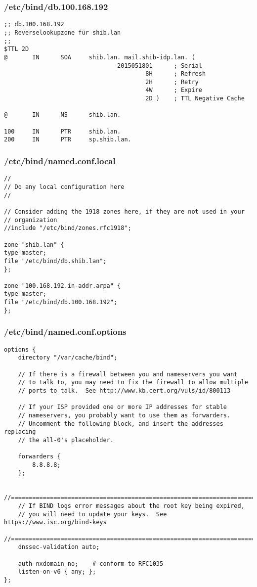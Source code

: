 \subsubsection{/etc/bind/db.100.168.192}
\begin{lstlisting}
;; db.100.168.192
;; Reverselookupzone für shib.lan
;;
$TTL 2D
@       IN      SOA     shib.lan. mail.shib-idp.lan. (
                                2015051801      ; Serial
                                        8H      ; Refresh
                                        2H      ; Retry
                                        4W      ; Expire
                                        2D )    ; TTL Negative Cache

@       IN      NS      shib.lan.

100     IN      PTR     shib.lan.
200     IN      PTR     sp.shib.lan.

\end{lstlisting}

\subsubsection{/etc/bind/named.conf.local}
\begin{lstlisting}
//
// Do any local configuration here
//

// Consider adding the 1918 zones here, if they are not used in your
// organization
//include "/etc/bind/zones.rfc1918";

zone "shib.lan" {
type master;
file "/etc/bind/db.shib.lan";
};

zone "100.168.192.in-addr.arpa" {
type master;
file "/etc/bind/db.100.168.192";
};
\end{lstlisting}

\subsubsection{/etc/bind/named.conf.options}
\begin{lstlisting}
options {
	directory "/var/cache/bind";

	// If there is a firewall between you and nameservers you want
	// to talk to, you may need to fix the firewall to allow multiple
	// ports to talk.  See http://www.kb.cert.org/vuls/id/800113

	// If your ISP provided one or more IP addresses for stable
	// nameservers, you probably want to use them as forwarders.
	// Uncomment the following block, and insert the addresses replacing
	// the all-0's placeholder.

	forwarders {
	 	8.8.8.8;
	};

	//========================================================================
	// If BIND logs error messages about the root key being expired,
	// you will need to update your keys.  See https://www.isc.org/bind-keys
	//========================================================================
	dnssec-validation auto;

	auth-nxdomain no;    # conform to RFC1035
	listen-on-v6 { any; };
};
\end{lstlisting}

